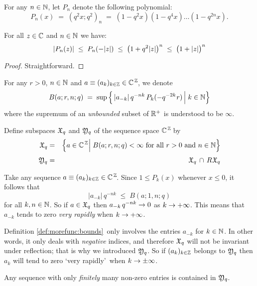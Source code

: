 \begin{notation} \rm
For any $n\in \mathbb{N}$, let $P_n$ denote the following polynomial:
$$ P_n(x) \;=\; (q^2 x; q^2)_n
          \;=\; (1 - q^2 x)(1 - q^4 x) \ldots (1 - q^{2n} x). $$
\end{notation}


\begin{lemma} \label{lemma:estimates:P_n}
For all\/ $z\in\mathbb{C}$ and\/ $n\in \mathbb{N}$ we have:
$$  |P_n(z)|    \;\leq\;   P_n(-|z|)
                \;\leq\;   \left(1 + q^2 |z|\vertM\right)^n
                \;\leq\;   \left(1 + |z|\vertM\right)^n  $$
\end{lemma}
\begin{proof}
Straightforward.
\end{proof}



\begin{defn}  \label{def:morefunc:bounds}
For any $r>0$, $n\in \mathbb{N}$ and $a\equiv (a_k)_{k\in\mathbb{Z}} \in \mathbb{C}^{\, \mathbb{Z}\!}$, we denote
$$ B(a; r, n; q)
    \;=\;  \sup  \left\{  \,
                    |a_{-k}| \, q^{-nk}\, P_k(-q^{-2k} \vssp r)
                    \left|\vertL\right.  k\in\NN  \right\} $$
where the supremum of an {\em unbounded\/} subset of $\mathbb{R}^+$ is understood to be $\infty$.
\end{defn}


\begin{defn*}
Define subspaces ${\mathfrak X}_q$ and ${\mathfrak Y}_q$ of the sequence space $\mathbb{C}^{\, \mathbb{Z}\!}$ by
\begin{eqnarray*}
\seqX
&=&
\left\{ a \in \CZ    \left|\vertL\right.
        B(a; r, n; q) < \infty
        \mbox{ for all $r>0$ and $n\in \NN$} \right\}
\\
\seqY &=& \seqX \,\cap\, R \vssp \seqX  \vertL
\end{eqnarray*}
\end{defn*}



\begin{remarks*} \label{rem:sequence_spaces}
\item
Take any sequence $a \equiv (a_k)_{k\in\mathbb{Z}} \in \mathbb{C}^{\, \mathbb{Z}\!}$.
Since $1 \leq P_k(x)$ whenever $x\leq 0$, it follows that
$$|a_{-k}| \, q^{-nk}     \;\leq\;   B(a; 1, n; q)$$
for all $k,n\in \mathbb{N}$.
So if $a\in {\mathfrak X}_q$ then $a_{-k} \, q^{-nk} \rightarrow 0$ as $k\rightarrow +\infty$.
This means that $a_{-k}$ tends to zero {\em very rapidly\/} when $k \rightarrow +\infty$.
\item
Definition \ref{def:morefunc:bounds}\ only involves the entries $a_{-k}$ for $k\in \mathbb{N}$.
In other words, it only deals with {\em negative\/} indices, and therefore ${\mathfrak X}_q$
will not be invariant under reflection; that is why we introduced ${\mathfrak Y}_q$.
So if $(a_k)_{k\in\mathbb{Z}}$ belongs to ${\mathfrak Y}_q$ then $a_k$ will tend to zero
\lq very rapidly\rq\ when $k \rightarrow \pm \infty$.
\item
Any sequence with only {\em finitely\/} many non-zero entries is contained in ${\mathfrak Y}_q$.
\end{remarks*}


